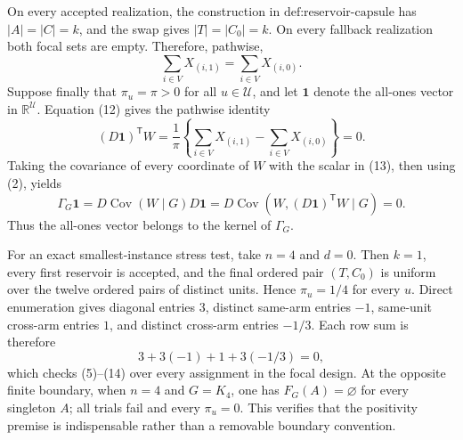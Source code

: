On every accepted realization, the construction in \(\text{def:reservoir-capsule}\) has \(|A|=|C|=k\), and the swap gives \(|T|=|C_0|=k\).  On every fallback realization both focal sets are empty.  Therefore, pathwise,
\[
 \sum_{i\in V}X_{(i,1)}
 =\sum_{i\in V}X_{(i,0)}. \tag{12}
\]
Suppose finally that \(\pi_u=\pi>0\) for all \(u\in\mathcal U\), and let \(\mathbf 1\) denote the all-ones vector in \(\mathbb R^{\mathcal U}\).  Equation (12) gives the pathwise identity
\[
 (D\mathbf 1)^{\mathsf T}W
 =\frac{1}{\pi}
 \left\{
 \sum_{i\in V}X_{(i,1)}-\sum_{i\in V}X_{(i,0)}
 \right\}
 =0. \tag{13}
\]
Taking the covariance of every coordinate of \(W\) with the scalar in (13), then using (2), yields
\[
 \Gamma_G\mathbf 1
 =D\operatorname{Cov}(W\mid G)D\mathbf 1
 =D\operatorname{Cov}\!\left(W,(D\mathbf 1)^{\mathsf T}W\mid G\right)
 =0. \tag{14}
\]
Thus the all-ones vector belongs to the kernel of \(\Gamma_G\).

For an exact smallest-instance stress test, take \(n=4\) and \(d=0\).  Then \(k=1\), every first reservoir is accepted, and the final ordered pair \((T,C_0)\) is uniform over the twelve ordered pairs of distinct units.  Hence \(\pi_u=1/4\) for every \(u\).  Direct enumeration gives diagonal entries \(3\), distinct same-arm entries \(-1\), same-unit cross-arm entries \(1\), and distinct cross-arm entries \(-1/3\).  Each row sum is therefore
\[
 3+3(-1)+1+3(-1/3)=0, \tag{15}
\]
which checks (5)--(14) over every assignment in the focal design.  At the opposite finite boundary, when \(n=4\) and \(G=K_4\), one has \(F_G(A)=\varnothing\) for every singleton \(A\); all trials fail and every \(\pi_u=0\).  This verifies that the positivity premise is indispensable rather than a removable boundary convention.
